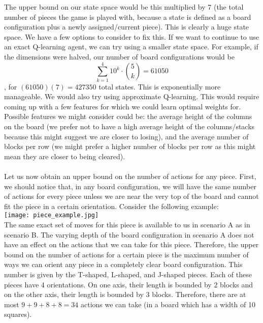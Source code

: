 \documentclass{article}
\begin{document}
\begin{enumerate}
    The upper bound on our state space would be this multiplied by 7 (the total number of pieces the game is played with, because a state is defined as a board configuration plus a newly assigned/current piece). This is clearly a huge state space. We have a few options to consider to fix this. If we want to continue to use an exact Q-learning agent, we can try using a smaller state space. For example, if the dimensions were halved, our number of board configurations would be  $$\sum_{k=1}^{4}10^k\cdot\binom{5}{k} = 61050$$, for $(61050)(7) = 427350$ total states. This is exponentially more manageable. We would also try using approximate Q-learning. This would require coming up with a few features for which we could learn optimal weights for. Possible features we might consider could be: the average height of the columns on the board (we prefer not to have a high average height of the columns/stacks because this might suggest we are closer to losing), and the average number of blocks per row (we might prefer a higher number of blocks per row as this might mean they are closer to being cleared).  \\\\
    Let us now obtain an upper bound on the number of actions for any piece. First, we should notice that, in any board configuration, we will have the same number of actions for every piece unless we are near the very top of the board and cannot fit the piece in a certain orientation. Consider the following example:\\
    \texttt{[image: piece\_example.jpg]}\\ The same exact set of moves for this piece is available to us in scenario A as in scenario B. The varying depth of the board configuration in scenario A does not have an effect on the actions that we can take for this piece. Therefore, the upper bound on the number of actions for a certain piece is the maximum number of ways we can orient any piece in a completely clear board configuration. This number is given by the T-shaped, L-shaped, and J-shaped pieces. Each of these pieces have 4 orientations. On one axis, their length is bounded by 2 blocks and on the other axis, their length is bounded by 3 blocks. Therefore, there are at most $9 + 9 + 8 + 8 = 34$ actions we can take (in a board which has a width of 10 squares).\\\\

\end{enumerate}
\end{document}
